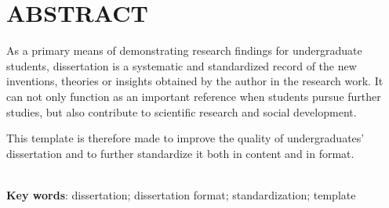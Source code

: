 

\section*{ABSTRACT}

\thesisbodyfont
As a primary means of demonstrating research findings for undergraduate students, dissertation is a systematic and standardized record of the new inventions, theories or insights obtained by the author in the research work. It can not only function as an important reference when students pursue further studies, but also contribute to scientific research and social development.\par
This template is therefore made to improve the quality of undergraduates' dissertation and to further standardize it both in content and in format.

~\\
\hspace*{2em}\textbf{Key words}: dissertation; dissertation format; standardization; template\\
